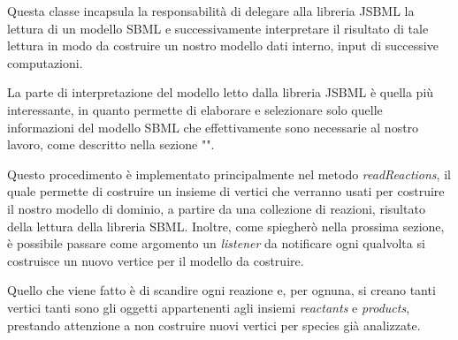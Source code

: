 Questa classe incapsula la responsabilit\`a di delegare alla libreria
JSBML la lettura di un modello SBML e successivamente interpretare il
risultato di tale lettura in modo da costruire un nostro modello dati
interno, input di successive computazioni.

La parte di interpretazione del modello letto dalla libreria JSBML \`e
quella pi\`u interessante, in quanto permette di elaborare e
selezionare solo quelle informazioni del modello SBML che
effettivamente sono necessarie al nostro lavoro, come descritto nella
sezione "". 

Questo procedimento \`e implementato principalmente nel metodo
\emph{readReactions}, il quale permette di costruire un insieme di
vertici che verranno usati per costruire il nostro modello di dominio,
a partire da una collezione di reazioni, risultato della lettura della
libreria SBML. Inoltre, come spiegher\`o nella prossima sezione, \`e
possibile passare come argomento un \emph{listener} da notificare ogni
qualvolta si costruisce un nuovo vertice per il modello da costruire.

Quello che viene fatto \`e di scandire ogni reazione e, per ognuna, si
creano tanti vertici tanti sono gli oggetti appartenenti agli insiemi
\emph{reactants} e \emph{products}, prestando attenzione a non
costruire nuovi vertici per species gi\`a analizzate.